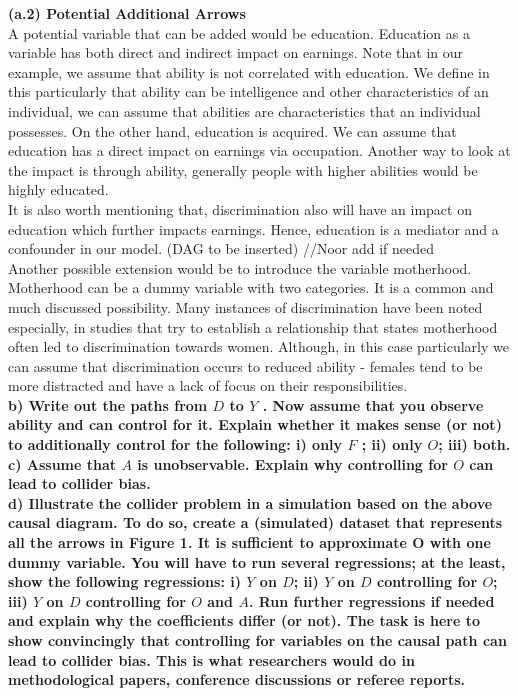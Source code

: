 \documentclass[a4paper,12pt,oneside,English]{article}
\begin{document}
\textbf{(a.2) Potential Additional Arrows}\\
A potential variable that can be added would be education. Education as a variable has both direct and indirect impact on earnings. Note that in our example, we assume that ability is not correlated with education. We define in this particularly that ability can be intelligence and other characteristics of an individual, we can assume that abilities are characteristics that an individual possesses. On the other hand, education is acquired. We can assume that education has a direct impact on earnings via occupation. Another way to look at the impact is through ability, generally people with higher abilities would be  highly educated.\\

It is also worth mentioning that, discrimination also will have an impact on education which further impacts earnings. Hence, education is a mediator and a confounder in our model. (DAG to be inserted) //Noor add if needed\\

Another possible extension would be to introduce the variable motherhood. Motherhood can be a dummy variable with two categories. It is a common and much discussed possibility. Many instances of discrimination have been noted especially, in studies that try to establish a relationship that states motherhood often led to discrimination towards women. Although, in this case particularly we can assume that discrimination occurs to reduced ability - females tend to be more distracted and have a lack of focus on their responsibilities.\\ 

\textbf{b) Write out the paths from $D$ to $Y$ . Now assume that you observe ability and can control for it. Explain whether it makes sense (or not) to additionally control for the following: i) only $F$ ; ii) only $O$; iii) both.}\\
\textbf{c) Assume that $A$ is unobservable. Explain why controlling for $O$ can lead to collider bias.}\\
\textbf{d) Illustrate the collider problem in a simulation based on the above causal diagram. To do so, create a (simulated) dataset that represents all the arrows in Figure 1. It is sufficient to approximate O with one dummy variable. You will have to run several regressions; at the least, show the following regressions: i) $Y$ on $D$; ii) $Y$ on $D$ controlling for $O$; iii) $Y$ on $D$ controlling for $O$ and $A$. Run further regressions if needed and explain why the coefficients differ (or not). The task is here to show convincingly that controlling for variables on the causal path can lead to collider bias. This is what researchers would do in methodological papers, conference discussions or referee reports.}
\end{document}
